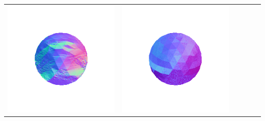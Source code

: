 \begin{tabularx}{\linewidth}{@{}Y@{}Y@{}Y@{}Y@{}Y@{}Y@{}}
\includegraphics[width=\linewidth]{semisynthetic/20150514_1_yu_out.png} &
\includegraphics[width=\linewidth]{semisynthetic/20150514_1_dpsn_out.png} &

\end{tabularx}
